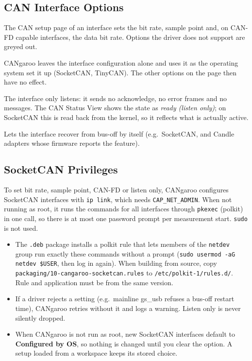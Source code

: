 \documentclass[a4paper,11pt]{article}
\newcommand{\ui}[1]{\textbf{#1}}
\newcommand{\file}[1]{\texttt{#1}}
\begin{document}
\subsection{CAN Interface Options}

The CAN setup page of an interface sets the bit rate, sample point and, on CAN-FD
capable interfaces, the data bit rate. Options the driver does not support are
greyed out.

\begin{description}[leftmargin=2em, style=nextline]
  \item[Configured by OS] CANgaroo leaves the interface configuration alone and
        uses it as the operating system set it up (SocketCAN, TinyCAN). The other
        options on the page then have no effect.
  \item[Bus Monitoring Mode (Listen Only)] The interface only listens: it sends
        no acknowledge, no error frames and no messages. The CAN Status View shows
        the state as \textit{ready (listen only)}; on SocketCAN this is read back
        from the kernel, so it reflects what is actually active.
  \item[Auto-Restart on Bus-Off Condition] Lets the interface recover from
        bus-off by itself (e.g.\ SocketCAN, and Candle adapters whose firmware
        reports the feature).
\end{description}

\subsection{SocketCAN Privileges}
\label{sec:socketcanpriv}

To set bit rate, sample point, CAN-FD or listen only, CANgaroo configures SocketCAN
interfaces with \texttt{ip link}, which needs \texttt{CAP\_NET\_ADMIN}. When not
running as root, it runs the commands for all interfaces through \texttt{pkexec}
(polkit) in one call, so there is at most one password prompt per measurement start.
\texttt{sudo} is not used.

\begin{itemize}
  \item The \file{.deb} package installs a polkit rule that lets members of the
        \texttt{netdev} group run exactly these commands without a prompt
        (\texttt{sudo usermod -aG netdev \$USER}, then log in again). When building
        from source, copy \file{packaging/10-cangaroo-socketcan.rules} to
        \file{/etc/polkit-1/rules.d/}. Rule and application must be from the same
        version.
  \item If a driver rejects a setting (e.g.\ mainline gs\_usb refuses a bus-off
        restart time), CANgaroo retries without it and logs a warning. Listen only
        is never silently dropped.
  \item When CANgaroo is not run as root, new SocketCAN interfaces default to
        \ui{Configured by OS}, so nothing is changed until you clear the option.
        A setup loaded from a workspace keeps its stored choice.
\end{itemize}
\end{document}
